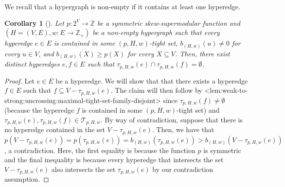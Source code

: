 \documentclass{article}
\def\Cref#1{<#1>}%
\newtheorem{corollary}{Corollary}[section]
\newcommand{\maximalTightSetFamily}[1]{\ensuremath{\calT_{#1}}\xspace}
\newcommand{\shubhang}[1]{{\color{blue}[{\tiny Shubhang: \bf #1}]\marginpar{\color{blue}*}}}
\newcommand{\knote}[1]{{\color{red}[{\tiny Karthik: \bf #1}]\marginpar{\color{red}*}}}
\newcommand{\maximalTightSetContainingHyperedge}[1]{\ensuremath{\tau_{#1}}\xspace}
\providecommand{\Z}{\mathbb{Z}}
\providecommand{\calT}{\mathcal{T}}
\begin{document}
We recall that a hypergraph is non-empty if it contains at least one hyperedge. 
\begin{corollary}[\hspace{-1sp}\cite{Bernath-Kiraly}]
\label{cor:weak-to-strong:uncrossing:exist-two-hyperedges-contained-in-disjoint-maximal-tight-sets}
Let $p:2^V\rightarrow\Z$ be a symmetric skew-supermodular function and $\left(H = (V, E), w:E \rightarrow\Z_+\right)$ be a non-empty hypergraph 
such that every hyperedge $e \in E$ is contained in some $(p, H, w)$-tight set, $b_{(H,w)}(u) \not = 0$ for every $u \in V$, and $b_{(H,w)}(X) \geq p(X)$ for every $X \subseteq V$. 
Then, there exist distinct hyperedges $e,f \in E$ such that $\maximalTightSetContainingHyperedge{p, H, w}(e) \cap \maximalTightSetContainingHyperedge{p, H, w}(f) = \emptyset$.
\end{corollary}
\begin{proof}
Let $e \in E$ be a hyperedge.
We will show that that there exists a hyperedge $f \in E$ such that $f \subseteq V - \maximalTightSetContainingHyperedge{p, H, w}(e)$. The claim will then follow by \Cref{lem:weak-to-strong:uncrossing:maximal-tight-set-family-disjoint} since $\maximalTightSetContainingHyperedge{p, H, w}(f) \not = \emptyset$ (because the hyperedge $f$ is contained in some $(p, H, w)$-tight set) and $\maximalTightSetContainingHyperedge{p, H, w}(e), \maximalTightSetContainingHyperedge{p, H , w}(f) \in \maximalTightSetFamily{p, H, w}$.
By way of contradiction, suppose that there is no hyperedge contained in the set $V - \maximalTightSetContainingHyperedge{p, H, w}(e)$. Then, we have that $p(V - \maximalTightSetContainingHyperedge{p, H, w}(e)) = p(\maximalTightSetContainingHyperedge{p, H, w}(e)) = b_{(H,w)}(\maximalTightSetContainingHyperedge{p, H, w}(e)) > b_{(H,w)}(V - \maximalTightSetContainingHyperedge{p, H, w}(e))$, a contradiction. Here, the first equality is because the function $p$ is symmetric and the final inequality is because every hyperedge that intersects the set $V - \maximalTightSetContainingHyperedge{p, H, w}(e)$ also intersects the set $\maximalTightSetContainingHyperedge{p, H, w}(e)$ by our contradiction assumption.
\end{proof}
\end{document}
